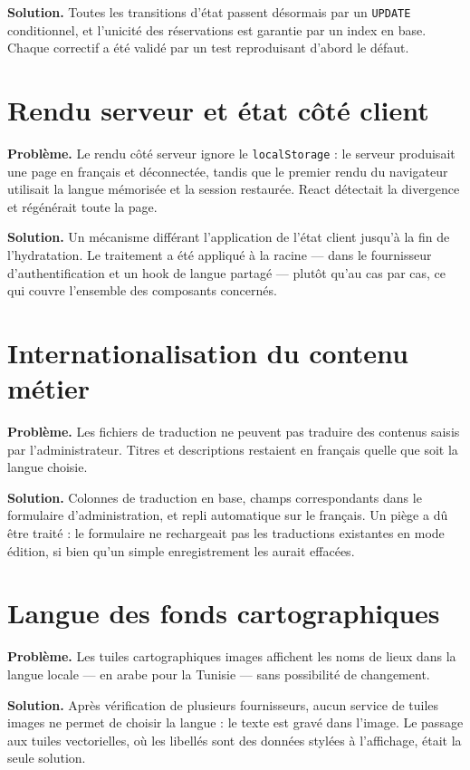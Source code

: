 \documentclass[11pt,a4paper]{report}
\begin{document}
\textbf{Solution.} Toutes les transitions d'état passent désormais par un
\texttt{UPDATE} conditionnel, et l'unicité des réservations est garantie par un
index en base. Chaque correctif a été validé par un test reproduisant d'abord le
défaut.

\section{Rendu serveur et état côté client}

\textbf{Problème.} Le rendu côté serveur ignore le \texttt{localStorage} : le
serveur produisait une page en français et déconnectée, tandis que le premier
rendu du navigateur utilisait la langue mémorisée et la session restaurée. React
détectait la divergence et régénérait toute la page.

\textbf{Solution.} Un mécanisme différant l'application de l'état client jusqu'à
la fin de l'hydratation. Le traitement a été appliqué à la racine — dans le
fournisseur d'authentification et un hook de langue partagé — plutôt qu'au cas
par cas, ce qui couvre l'ensemble des composants concernés.

\section{Internationalisation du contenu métier}

\textbf{Problème.} Les fichiers de traduction ne peuvent pas traduire des
contenus saisis par l'administrateur. Titres et descriptions restaient en
français quelle que soit la langue choisie.

\textbf{Solution.} Colonnes de traduction en base, champs correspondants dans le
formulaire d'administration, et repli automatique sur le français. Un piège a dû
être traité : le formulaire ne rechargeait pas les traductions existantes en
mode édition, si bien qu'un simple enregistrement les aurait effacées.

\section{Langue des fonds cartographiques}

\textbf{Problème.} Les tuiles cartographiques images affichent les noms de lieux
dans la langue locale — en arabe pour la Tunisie — sans possibilité de
changement.

\textbf{Solution.} Après vérification de plusieurs fournisseurs, aucun service de
tuiles images ne permet de choisir la langue : le texte est gravé dans l'image.
Le passage aux tuiles vectorielles, où les libellés sont des données stylées à
l'affichage, était la seule solution.
\end{document}
